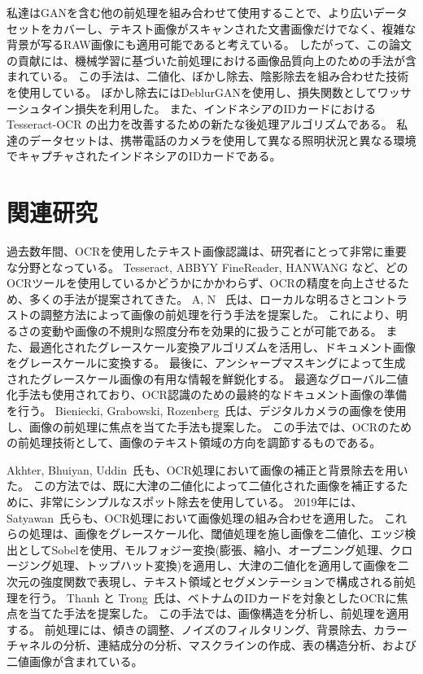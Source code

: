 \documentclass[uplatex, twocolumn,10pt]{jsarticle}
\begin{document}
私達はGANを含む他の前処理を組み合わせて使用することで、より広いデータセットをカバーし、テキスト画像がスキャンされた文書画像だけでなく、複雑な背景が写るRAW画像にも適用可能であると考えている。
したがって、この論文の貢献には、機械学習に基づいた前処理における画像品質向上のための手法が含まれている。
この手法は、二値化、ぼかし除去、陰影除去を組み合わせた技術を使用している。
ぼかし除去にはDeblurGANを使用し、損失関数としてワッサーシュタイン損失を利用した。
また、インドネシアのIDカードにおける Tesseract-OCR の出力を改善するための新たな後処理アルゴリズムである。
私達のデータセットは、携帯電話のカメラを使用して異なる照明状況と異なる環境でキャプチャされたインドネシアのIDカードである。



\section{関連研究}

過去数年間、OCRを使用したテキスト画像認識は、研究者にとって非常に重要な分野となっている。
Tesseract, ABBYY FineReader, HANWANG など、どのOCRツールを使用しているかどうかにかかわらず、OCRの精度を向上させるため、多くの手法が提案されてきた。
A, N ~\cite{bib12}氏は、ローカルな明るさとコントラストの調整方法によって画像の前処理を行う手法を提案した。
これにより、明るさの変動や画像の不規則な照度分布を効果的に扱うことが可能である。
また、最適化されたグレースケール変換アルゴリズムを活用し、ドキュメント画像をグレースケールに変換する。
最後に、アンシャープマスキングによって生成されたグレースケール画像の有用な情報を鮮鋭化する。
最適なグローバル二値化手法も使用されており、OCR認識のための最終的なドキュメント画像の準備を行う。
Bieniecki, Grabowski, Rozenberg~\cite{bib1}氏は、デジタルカメラの画像を使用し、画像の前処理に焦点を当てた手法も提案した。
この手法では、OCRのための前処理技術として、画像のテキスト領域の方向を調節するものである。

Akhter, Bhuiyan, Uddin~\cite{bib5}氏も、OCR処理において画像の補正と背景除去を用いた。
この方法では、既に大津の二値化によって二値化された画像を補正するために、非常にシンプルなスポット除去を使用している。
2019年には、Satyawan~\cite{bib4}氏らも、OCR処理において画像処理の組み合わせを適用した。
これらの処理は、画像をグレースケール化、閾値処理を施し画像を二値化、エッジ検出としてSobelを使用、モルフォジー変換(膨張、縮小、オープニング処理、クロージング処理、トップハット変換)を適用し、大津の二値化を適用して画像を二次元の強度関数で表現し、テキスト領域とセグメンテーションで構成される前処理を行う。
Thanh と Trong~\cite{bib7}氏は、ベトナムのIDカードを対象としたOCRに焦点を当てた手法を提案した。
この手法では、画像構造を分析し、前処理を適用する。
前処理には、傾きの調整、ノイズのフィルタリング、背景除去、カラーチャネルの分析、連結成分の分析、マスクラインの作成、表の構造分析、および二値画像が含まれている。
\end{document}
